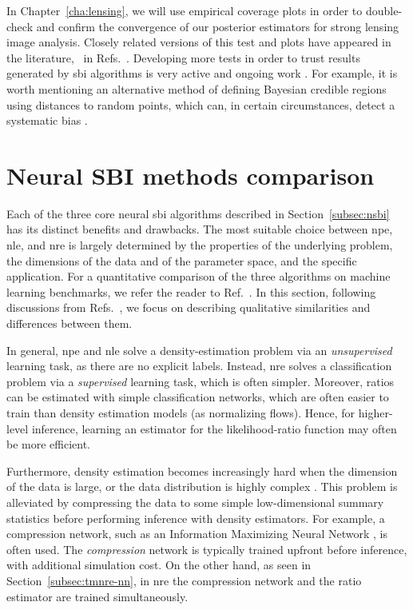 In Chapter~\ref{cha:lensing}, we will use empirical coverage plots in order to double-check and confirm the convergence of our posterior estimators for strong lensing image analysis. Closely related versions of this test and plots have appeared in the literature, \eg~in Refs.~\cite{Dax:2021tsq,Karchev:2022xyn, Bhardwaj:2023xph}. Developing more tests in order to trust results generated by \gls*{sbi} algorithms is very active and ongoing work \cite{linhart2024c2st, lemos2023sampling}. For example, it is worth mentioning an alternative method of defining Bayesian credible regions using distances to random points, which can, in certain circumstances, detect a systematic bias \cite{lemos2023sampling}.


\section{Neural SBI methods comparison} \label{sec:comparison}

Each of the three core neural \gls*{sbi} algorithms described in Section~\ref{subsec:nsbi} has its distinct benefits and drawbacks. The most suitable choice between \gls*{npe}, \gls*{nle}, and \gls*{nre} is largely determined by the properties of the underlying problem, the dimensions of the data and of the parameter space, and the specific application. For a quantitative comparison of the three algorithms on machine learning benchmarks, we refer the reader to Ref.~\cite{Lueckmann:2021aa}. In this section, following discussions from Refs.~\cite{Cranmer:2019eaq, Cole:2021gwr, Ho:2024whi}, we focus on describing qualitative similarities and differences between them.

In general, \gls*{npe} and \gls*{nle} solve a density-estimation problem via an \emph{unsupervised} learning task, as there are no explicit labels. Instead, \gls*{nre} solves a classification problem via a \emph{supervised} learning task, which is often simpler. Moreover, ratios can be estimated with simple classification networks, which are often easier to train than density estimation models (as normalizing flows). Hence, for higher-level inference, learning an estimator for the likelihood-ratio function may often be more efficient.

Furthermore, density estimation becomes increasingly hard when the dimension of the data is large, or the data distribution is highly complex \cite{papamakarios2021normalizing}. This problem is alleviated by compressing the data to some simple low-dimensional summary statistics before performing inference with density estimators. For example, a compression network, such as an Information Maximizing Neural Network \cite{charnock2018automatic}, is often used. The \emph{compression} network is typically trained upfront before inference, with additional simulation cost. On the other hand, as seen in Section~\ref{subsec:tmnre-nn}, in \gls*{nre} the compression network and the ratio estimator are trained simultaneously.    	 


